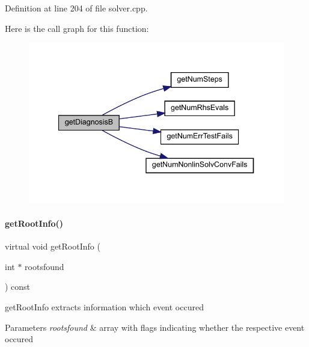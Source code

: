 Definition at line 204 of file solver.\+cpp.

Here is the call graph for this function\+:
\nopagebreak
\begin{figure}[H]
\begin{center}
\leavevmode
\includegraphics[width=340pt]{classamici_1_1_solver_aa7aec3090326db73739483e141e65cda_cgraph}
\end{center}
\end{figure}
\mbox{\label{classamici_1_1_solver_acab2ddcee3d62bef9f3e186aee8898e9}} 
\paragraph{\texorpdfstring{get\+Root\+Info()}{getRootInfo()}}
{\footnotesize\ttfamily virtual void get\+Root\+Info (\begin{DoxyParamCaption}\item[{int $\ast$}]{rootsfound }\end{DoxyParamCaption}) const\hspace{0.3cm}{\ttfamily [pure virtual]}}

get\+Root\+Info extracts information which event occured


\begin{DoxyParams}{Parameters}
{\em rootsfound} & array with flags indicating whether the respective event occured \\
\hline
\end{DoxyParams}
\mbox{\label{classamici_1_1_solver_acfcd1423675ef1abc302f3ac50353932}} 
